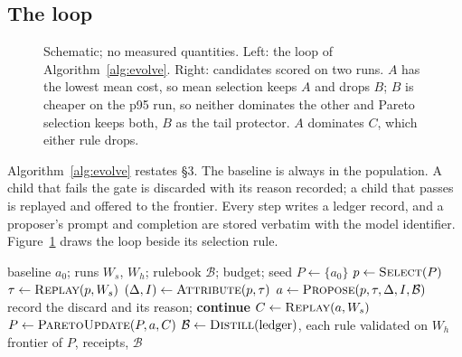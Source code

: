 \subsection{The loop}\label{sec:theloop}
\begin{figure}[t]
  \centering
  
  \caption{Schematic; no measured quantities. Left: the loop of
    Algorithm~\ref{alg:evolve}. Right: candidates scored on two runs. $A$ has
    the lowest mean cost, so mean selection keeps $A$ and drops $B$; $B$ is
    cheaper on the p95 run, so neither dominates the other and Pareto
    selection keeps both, $B$ as the tail protector. $A$ dominates $C$, which
    either rule drops.}
  \label{fig:schematic-pareto}
\end{figure}


Algorithm~\ref{alg:evolve} restates  \S3. The baseline is always
in the population. A child that fails the gate is discarded with its reason
recorded; a child that passes is replayed and offered to the frontier. Every
step writes a ledger record, and a proposer's prompt and completion are stored
verbatim with the model identifier. Figure~\ref{fig:schematic-pareto} draws the
loop beside its selection rule.

\begin{algorithm}[t]
  \caption{Evolve (after  \S3). $W_s$ and $W_h$ are the
    search and held-out runs. Every computed value is also written to the
    ledger.}
  \label{alg:evolve}
  \small
  \begin{algorithmic}[1]
    \Require baseline $a_0$; runs $W_s$, $W_h$; rulebook $\mathcal{B}$;
      budget; seed
    \State $P \gets \{a_0\}$ 
      \State $p \gets \textsc{Select}(P)$ 
      \State $\tau \gets \textsc{Replay}(p, W_s)$ 
      \State $(\Delta, I) \gets \textsc{Attribute}(p, \tau)$
      \State $a \gets \textsc{Propose}(p, \tau, \Delta, I, \mathcal{B})$
        \State record the discard and its reason; \textbf{continue}
      \EndIf
      \State $C \gets \textsc{Replay}(a, W_s)$
      \State $P \gets \textsc{ParetoUpdate}(P, a, C)$
    \EndWhile
    \State $\mathcal{B} \gets \textsc{Distill}(\text{ledger})$, each rule
      validated on $W_h$
    \State \Return frontier of $P$, receipts, $\mathcal{B}$
  \end{algorithmic}
\end{algorithm}

